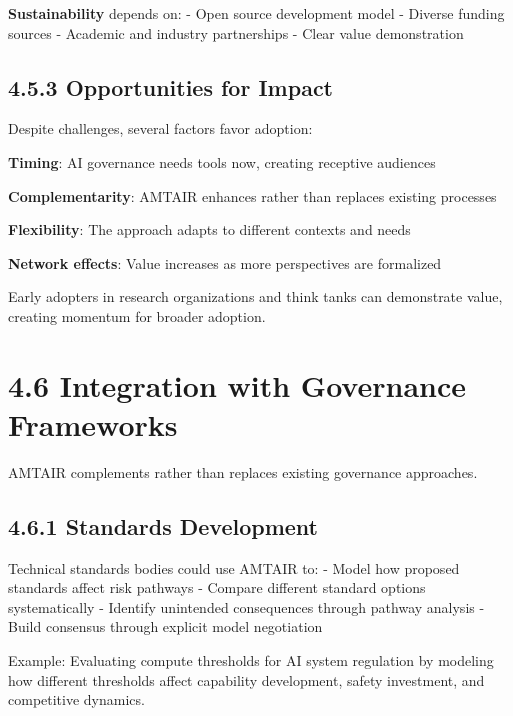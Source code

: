 \documentclass[
  11pt,
  letterpaper,
]{book}
\begin{document}
\textbf{Sustainability} depends on: - Open source development model -
Diverse funding sources - Academic and industry partnerships - Clear
value demonstration

\subsection*{4.5.3 Opportunities for
Impact}\label{sec-impact-opportunities}

Despite challenges, several factors favor adoption:

\textbf{Timing}: AI governance needs tools now, creating receptive
audiences

\textbf{Complementarity}: AMTAIR enhances rather than replaces existing
processes

\textbf{Flexibility}: The approach adapts to different contexts and
needs

\textbf{Network effects}: Value increases as more perspectives are
formalized

Early adopters in research organizations and think tanks can demonstrate
value, creating momentum for broader adoption.

\section*{4.6 Integration with Governance
Frameworks}\label{sec-governance-integration}


AMTAIR complements rather than replaces existing governance approaches.

\subsection*{4.6.1 Standards
Development}\label{sec-standards-integration}

Technical standards bodies could use AMTAIR to: - Model how proposed
standards affect risk pathways - Compare different standard options
systematically - Identify unintended consequences through pathway
analysis - Build consensus through explicit model negotiation

Example: Evaluating compute thresholds for AI system regulation by
modeling how different thresholds affect capability development, safety
investment, and competitive dynamics.
\end{document}
